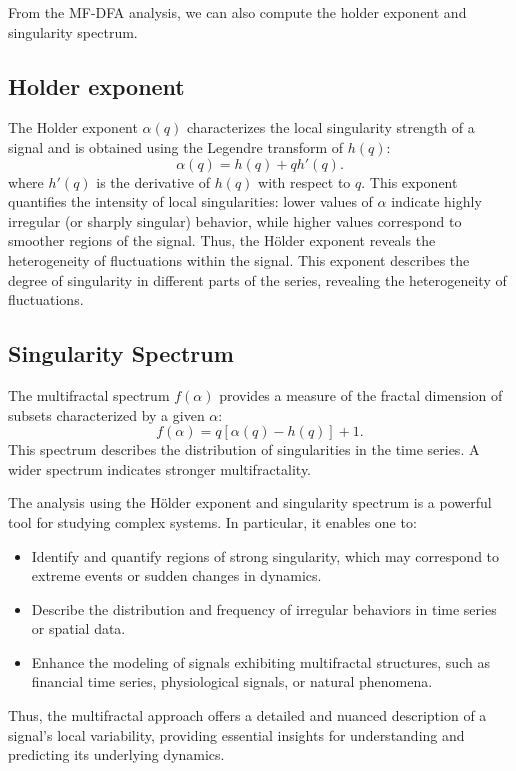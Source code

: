 \documentclass[11pt]{extarticle}
\begin{document}
From the MF-DFA analysis, we can also compute the holder exponent and singularity spectrum.

\subsection{Holder exponent}
The Holder exponent $\alpha(q)$ characterizes the local singularity strength of a signal and is obtained using the Legendre transform of $h(q)$:
\begin{equation}
\alpha(q) = h(q) + q h'(q).
\end{equation}
where $h'(q)$ is the derivative of $h(q)$ with respect to $q$. This exponent quantifies the intensity of local
singularities: lower values of $\alpha$ indicate highly irregular (or sharply singular) behavior, while higher
values correspond to smoother regions of the signal. Thus, the Hölder exponent reveals the heterogeneity of fluctuations within the signal.
This exponent describes the degree of singularity in different parts of the series, revealing the heterogeneity of fluctuations.

\subsection{Singularity Spectrum}
The multifractal spectrum $f(\alpha)$ provides a measure of the fractal dimension of subsets characterized by a given $\alpha$:
\begin{equation}
f(\alpha) = q [\alpha(q) - h(q)] + 1.
\end{equation}
This spectrum describes the distribution of singularities in the time series. A wider spectrum indicates stronger multifractality.

The analysis using the Hölder exponent and singularity spectrum is a powerful tool for studying complex systems. In particular, it enables one to:
\begin{itemize}
    \item Identify and quantify regions of strong singularity, which may correspond to extreme events or sudden changes in dynamics.
    \item Describe the distribution and frequency of irregular behaviors in time series or spatial data.
    \item Enhance the modeling of signals exhibiting multifractal structures, such as financial time series, physiological signals, or natural phenomena.
\end{itemize}
Thus, the multifractal approach offers a detailed and nuanced description of a signal's local variability, providing essential insights for understanding and predicting its underlying dynamics. \\
\end{document}
